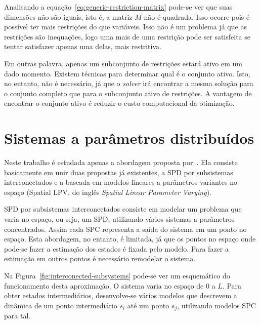 Analisando a equação~\eqref{eq:generic-restriction-matrix} pode-se ver que suas
dimensões não são iguais, isto é, a matriz \( M \) não é quadrada. Isso ocorre
pois é possível ter mais restrições do que variáveis. Isso não é um problema já
que as restrições são inequações, logo uma mais de uma restrição pode ser
satisfeita se tentar satisfazer apenas uma delas, mais restritiva.

Em outras palavra, apenas um subconjunto de restrições estará ativo em um dado
momento. Existem técnicas para determinar qual é o conjunto ativo. Isto, no
entanto, não é necessário, já que o \textit{solver} irá encontrar a mesma
solução para o conjunto completo que para o subconjunto ativo de restrições. A
vantagem de encontrar o conjunto ativo é reduzir o custo computacional da
otimização.

\pagebreak

\section{Sistemas a parâmetros distribuídos}%
\label{sec:spd}

Neste trabalho é estudada apenas a abordagem proposta
por~\textcite{masterthesis:nelson}. Ela consiste basicamente em unir duas
propostas já existentes, a SPD por subsistemas interconectados e a baseada em
modelos lineares a parâmetros variantes no espaço (Spatial \ac{LPV}, do inglês
\textit{Spatial Linear Parameter Varying}).

SPD por subsistemas interconectados consiste em modelar um problema que varia no
espaço, ou seja, um \ac{SPD}, utilizando vários sistemas a parâmetros
concentrados. Assim cada \ac{SPC} representa a saída do sistema em um ponto no
espaço. Esta abordagem, no entanto, é limitada, já que os pontos no espaço onde
pode-se fazer a estimação dos estados é fixada pelo modelo. Para fazer a
estimação em outros pontos é necessário remodelar o sistema.

Na Figura~\ref{fig:interconected-subsystems} pode-se ver um esquemático do
funcionamento desta aproximação. O sistema varia no espaço de \( 0 \) a \( L \).
Para obter estados intermediários, desenvolve-se vários modelos que descrevem a
dinâmica de um ponto intermediário \( s_i \) até um ponto \( s_j \), utilizando
modelos \ac{SPC} para tal.

